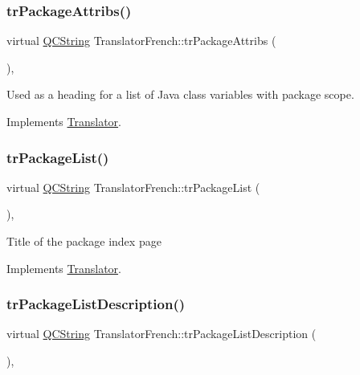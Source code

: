 \subsubsection{\texorpdfstring{trPackageAttribs()}{trPackageAttribs()}}
{\footnotesize\ttfamily virtual \mbox{\hyperlink{class_q_c_string}{Q\+C\+String}} Translator\+French\+::tr\+Package\+Attribs (\begin{DoxyParamCaption}{ }\end{DoxyParamCaption})\hspace{0.3cm}{\ttfamily [inline]}, {\ttfamily [virtual]}}

Used as a heading for a list of Java class variables with package scope. 

Implements \mbox{\hyperlink{class_translator}{Translator}}.

\mbox{\label{class_translator_french_a8c40ff1faed16bd2e544b8758308a5b0}} 
\subsubsection{\texorpdfstring{trPackageList()}{trPackageList()}}
{\footnotesize\ttfamily virtual \mbox{\hyperlink{class_q_c_string}{Q\+C\+String}} Translator\+French\+::tr\+Package\+List (\begin{DoxyParamCaption}{ }\end{DoxyParamCaption})\hspace{0.3cm}{\ttfamily [inline]}, {\ttfamily [virtual]}}

Title of the package index page 

Implements \mbox{\hyperlink{class_translator}{Translator}}.

\mbox{\label{class_translator_french_a8725536efd21644c0564907843e00ddb}} 
\subsubsection{\texorpdfstring{trPackageListDescription()}{trPackageListDescription()}}
{\footnotesize\ttfamily virtual \mbox{\hyperlink{class_q_c_string}{Q\+C\+String}} Translator\+French\+::tr\+Package\+List\+Description (\begin{DoxyParamCaption}{ }\end{DoxyParamCaption})\hspace{0.3cm}{\ttfamily [inline]}, {\ttfamily [virtual]}}

